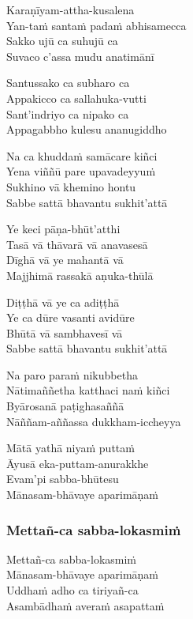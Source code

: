 
\begin{paritta}

Karaṇīyam-attha-kusalena\\
Yan-taṁ santaṁ padaṁ abhisamecca\\
Sakko ujū ca suhujū ca\\
Suvaco c'assa mudu anatimānī

Santussako ca subharo ca\\
Appakicco ca sallahuka-vutti\\
Sant'indriyo ca nipako ca\\
Appagabbho kulesu ananugiddho

Na ca khuddaṁ samācare kiñci\\
Yena viññū pare upavadeyyuṁ\\
Sukhino vā khemino hontu\\
Sabbe sattā bhavantu sukhit'attā

Ye keci pāṇa-bhūt'atthi\\
Tasā vā thāvarā vā anavasesā\\
Dīghā vā ye mahantā vā\\
Majjhimā rassakā aṇuka-thūlā

Diṭṭhā vā ye ca adiṭṭhā\\
Ye ca dūre vasanti avidūre\\
Bhūtā vā sambhavesī vā\\
Sabbe sattā bhavantu sukhit'attā

Na paro paraṁ nikubbetha\\
Nātimaññetha katthaci naṁ kiñci\\
Byārosanā paṭighasaññā\\
Nāññam-aññassa dukkham-iccheyya

Mātā yathā niyaṁ puttaṁ\\
Āyusā eka-puttam-anurakkhe\\
Evam'pi sabba-bhūtesu\\
Mānasam-bhāvaye aparimāṇaṁ

\subsubsection{Mettañ-ca sabba-lokasmiṁ}



Mettañ-ca sabba-lokasmiṁ\\
Mānasam-bhāvaye aparimāṇaṁ\\
Uddhaṁ adho ca tiriyañ-ca\\
Asambādhaṁ averaṁ asapattaṁ


\end{paritta}
